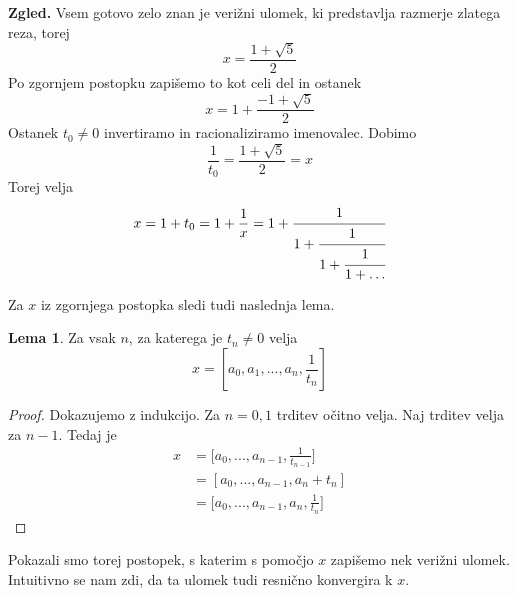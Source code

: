 \documentclass[a4paper,12pt]{article}
\theoremstyle{definition}
\theoremstyle{proposition}
\theoremstyle{theorem}
\theoremstyle{lemma}
\newtheorem{lem}{Lema}[section]
\begin{document}
\textbf{Zgled.} Vsem gotovo zelo znan je verižni ulomek, ki predstavlja razmerje zlatega reza, torej \[x = \frac{1+\sqrt{5}}{2} \] Po zgornjem postopku zapišemo to kot celi del in ostanek \[x = 1 +\frac{-1+\sqrt{5}}{2} \] Ostanek $t_0 \neq 0$ invertiramo in racionaliziramo imenovalec. Dobimo \[\frac{1}{t_0} =\frac{1+\sqrt{5}}{2} = x \] Torej velja \[x = 1 + t_0 = 1 + \frac{1}{x} = 1 + \cfrac{1}{1+\cfrac{1}{1+\cfrac{1}{1+\ldots}}}\]

Za $x$ iz zgornjega postopka sledi tudi naslednja lema.

\begin{lem}
\label{lema}
Za vsak $n$, za katerega je $t_n \neq 0$ velja
\[ x=[a_0, a_1, ..., a_n, \frac{1}{t_n}] \]
\end{lem}
\begin{proof}
Dokazujemo z indukcijo. Za $n=0,1$ trditev očitno velja. Naj trditev velja za $n-1$. Tedaj je
\begin{equation}
\begin{split}
x &= \big[a_0,...,a_{n-1},\frac{1}{t_{n-1}}\big] \\
&= [a_0,...,a_{n-1}, a_n + t_n] \\
&= \big[a_0, ...,a_{n-1}, a_n, \frac{1}{t_n}\big]
\end{split}
\end{equation}
\end{proof}

Pokazali smo torej postopek, s katerim s pomočjo $x$ zapišemo nek verižni ulomek. Intuitivno se nam zdi, da ta ulomek tudi resnično konvergira k $x$.
\end{document}
